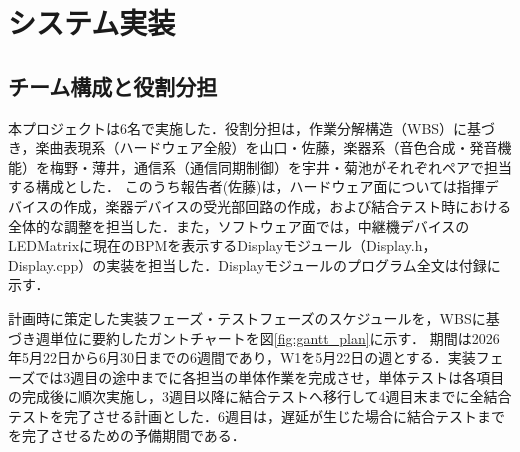 \section{システム実装}
\label{sec:jissou}

\subsection{チーム構成と役割分担}
\label{sec:jissou_team}
本プロジェクトは6名で実施した．役割分担は，作業分解構造（WBS）に基づき，楽曲表現系（ハードウェア全般）を山口・佐藤，楽器系（音色合成・発音機能）を梅野・薄井，通信系（通信同期制御）を宇井・菊池がそれぞれペアで担当する構成とした．
このうち報告者(佐藤)は，ハードウェア面については指揮デバイスの作成，楽器デバイスの受光部回路の作成，および結合テスト時における全体的な調整を担当した．また，ソフトウェア面では，中継機デバイスのLEDMatrixに現在のBPMを表示するDisplayモジュール（Display.h，Display.cpp）の実装を担当した．Displayモジュールのプログラム全文は付録に示す．


\iffalse
計画時に策定した実装フェーズ・テストフェーズのスケジュールを，WBSに基づき週単位に要約したガントチャートを図\ref{fig:gantt_plan}に示す．
期間は2026年5月22日から6月30日までの6週間であり，W1を5月22日の週とする．実装フェーズでは3週目の途中までに各担当の単体作業を完成させ，単体テストは各項目の完成後に順次実施し，3週目以降に結合テストへ移行して4週目末までに全結合テストを完了させる計画とした．6週目は，遅延が生じた場合に結合テストまでを完了させるための予備期間である．

